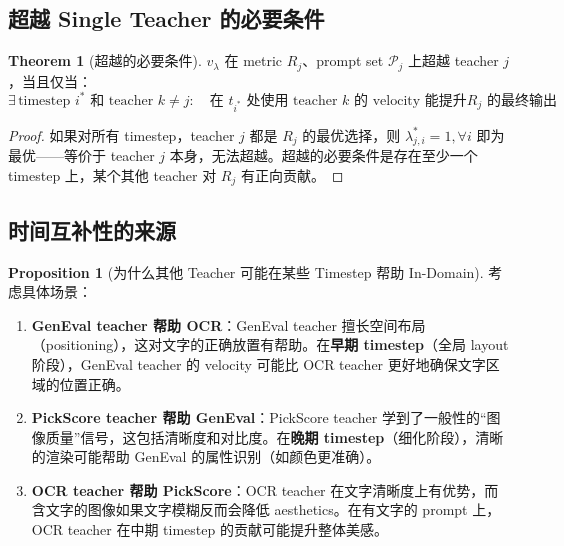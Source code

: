 \documentclass[11pt,a4paper]{article}
\theoremstyle{definition}
\newtheorem{proposition}{Proposition}
\newtheorem{theorem}{Theorem}
\begin{document}
\subsection{超越 Single Teacher 的必要条件}

\begin{theorem}[超越的必要条件]
\label{thm:necessary}
$v_\lambda$ 在 metric $R_j$、prompt set $\mathcal{P}_j$ 上超越 teacher $j$，当且仅当：
\begin{equation}
\exists\, \text{timestep } i^* \text{ 和 teacher } k \neq j: \quad
\text{在 } t_{i^*} \text{ 处使用 teacher } k \text{ 的 velocity 能提升} R_j \text{ 的最终输出}
\end{equation}
\end{theorem}

\begin{proof}
如果对所有 timestep，teacher $j$ 都是 $R_j$ 的最优选择，则 $\lambda^*_{j,i} = 1, \forall i$ 即为最优——等价于 teacher $j$ 本身，无法超越。超越的必要条件是存在至少一个 timestep 上，某个其他 teacher 对 $R_j$ 有正向贡献。
\end{proof}

\subsection{时间互补性的来源}

\begin{proposition}[为什么其他 Teacher 可能在某些 Timestep 帮助 In-Domain]
\label{prop:complementarity}
考虑具体场景：
\begin{enumerate}[leftmargin=1.5em]
\item \textbf{GenEval teacher 帮助 OCR}：GenEval teacher 擅长空间布局（positioning），这对文字的正确放置有帮助。在\textbf{早期 timestep}（全局 layout 阶段），GenEval teacher 的 velocity 可能比 OCR teacher 更好地确保文字区域的位置正确。

\item \textbf{PickScore teacher 帮助 GenEval}：PickScore teacher 学到了一般性的``图像质量''信号，这包括清晰度和对比度。在\textbf{晚期 timestep}（细化阶段），清晰的渲染可能帮助 GenEval 的属性识别（如颜色更准确）。

\item \textbf{OCR teacher 帮助 PickScore}：OCR teacher 在文字清晰度上有优势，而含文字的图像如果文字模糊反而会降低 aesthetics。在有文字的 prompt 上，OCR teacher 在中期 timestep 的贡献可能提升整体美感。
\end{enumerate}
\end{proposition}
\end{document}
